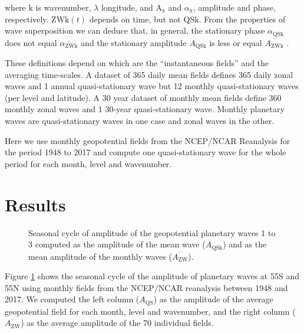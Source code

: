 \documentclass[draft,linenumbers]{agujournal2018}
\begin{document}
where \(\mathrm{k}\) is wavenumber, \(\lambda\) longitude, and
\(\mathrm{A_{x}}\) and \(\alpha_\mathrm{x}\), amplitude and phase,
respectively. \(\mathrm{ZWk}(t)\) depends on time, but not
\(\mathrm{QSk}\). From the properties of wave superposition we can
deduce that, in general, the stationary phase \(\alpha_\mathrm{QSk}\)
does not equal \(\overline{\alpha_\mathrm{ZWk}}\) and the stationary
amplitude \(A_\mathrm{QSk}\) is less or equal
\(\overline{A_\mathrm{ZWk}}\) \citep{Pain2005}.

These definitions depend on which are the ``instantaneous fields'' and
the averaging time-scales. A dataset of 365 daily mean fields defines
365 daily zonal waves and 1 annual quasi-stationary wave but 12 monthly
quasi-stationary waves (per level and latitude). A 30 year dataset of
monthly mean fields define 360 monthly zonal waves and 1 30-year
quasi-stationary wave. Monthly planetary waves are quasi-stationary
waves in one case and zonal waves in the other.

Here we use monthly geopotential fields from the NCEP/NCAR Reanalysis
\citep{Kalnay1996} for the period 1948 to 2017 and compute one
quasi-stationary wave for the whole period for each month, level and
wavenumber.

\section{Results}

\begin{figure}[h]

{\centering {}\newline{}

}

\caption{Seasonal cycle of amplitude of the geopotential planetary waves 1 to 3 computed as the amplitude of the mean wave ($A_\mathrm{QSk}$) and as the mean amplitude of the monthly waves ($\overline{A_\mathrm{ZW} }$).}\label{fig:rao}
\end{figure}

Figure \ref{fig:rao} shows the seasonal cycle of the amplitude of
planetary waves at 55\degree S and 55\degree N using monthly fields from
the NCEP/NCAR reanalysis \citep{Kalnay1996} between 1948 and 2017. We
computed the left column (\(A_\mathrm{QS}\)) as the amplitude of the
average geopotential field for each month, level and wavenumber, and the
right column (\(\overline{A_\mathrm{ZW}}\)) as the average amplitude of
the 70 individual fields.
\end{document}
